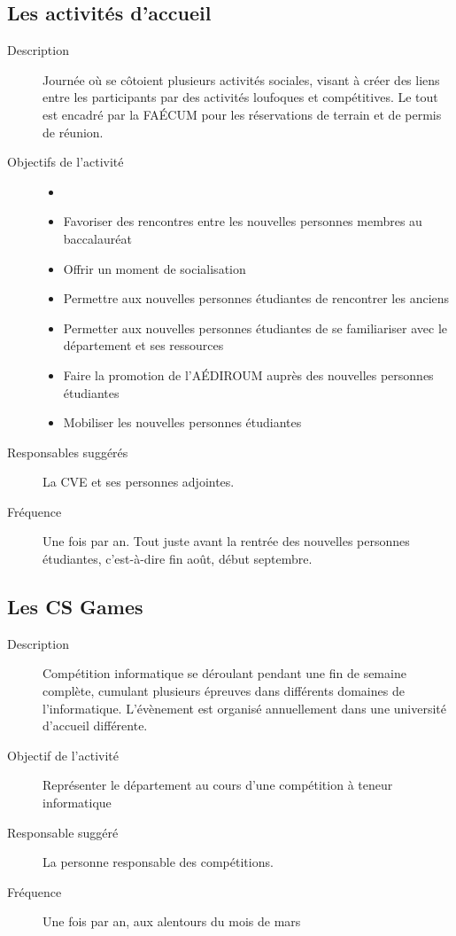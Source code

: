 \documentclass{aediroum}
\begin{document}
\subsection{Les activités d’accueil}\label{sec:activites-accueil}

\begin{description}
    \item[Description] Journée où se côtoient plusieurs activités sociales, visant à créer des liens entre les participants par des activités loufoques et compétitives. Le tout est encadré par la FAÉCUM pour les réservations de terrain et de permis de réunion.
    \item[Objectifs de l'activité]
    \begin{itemize}
        \item[]
        \item Favoriser des rencontres entre les nouvelles personnes membres au baccalauréat
        \item Offrir un moment de socialisation
        \item Permettre aux nouvelles personnes étudiantes de rencontrer les anciens
        \item Permetter aux nouvelles personnes étudiantes de se familiariser avec le département et ses ressources
        \item Faire la promotion de l'AÉDIROUM auprès des nouvelles personnes étudiantes
        \item Mobiliser les nouvelles personnes étudiantes
    \end{itemize}
    \item[Responsables suggérés] La CVE et ses personnes adjointes.
    \item[Fréquence] Une fois par an. Tout juste avant la rentrée des nouvelles personnes étudiantes, c'est-à-dire fin août, début septembre.
\end{description}

\subsection{Les CS Games}\label{sec:cs-games}

\begin{description}
    \item[Description] Compétition informatique se déroulant pendant une fin de semaine complète, cumulant plusieurs épreuves dans différents domaines de l'informatique. L'évènement est organisé annuellement dans une université d'accueil différente.
    \item[Objectif de l'activité] Représenter le département au cours d'une compétition à teneur informatique
    \item[Responsable suggéré] La personne responsable des compétitions.
    \item[Fréquence] Une fois par an, aux alentours du mois de mars
\end{description}
\end{document}
